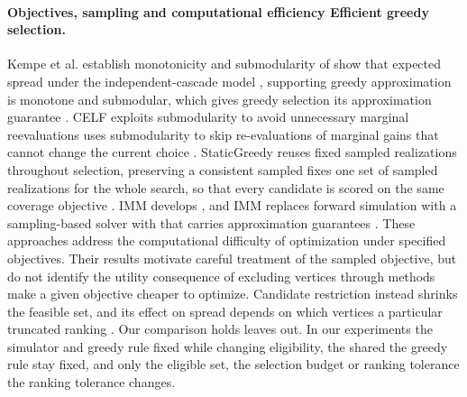 \documentclass[smallextended]{svjour3}
\providecommand{\DIFaddtex}[1]{{\protect\color{blue} \sf #1}} %
\providecommand{\DIFdeltex}[1]{{\protect\color{red} \scriptsize #1}} %
\providecommand{\DIFaddbegin}{} %
\providecommand{\DIFaddend}{} %
\providecommand{\DIFdelbegin}{} %
\providecommand{\DIFdelend}{} %
\providecommand{\DIFadd}[1]{\texorpdfstring{\DIFaddtex{#1}}{#1}} %
\providecommand{\DIFdel}[1]{\texorpdfstring{\DIFdeltex{#1}}{}} %
\providecommand{\DIFscaledelfig}{0.5}
\newlength{\DIFdelgraphicswidth} %
\newlength{\DIFdelgraphicsheight} %
\providecommand{\DIFaddincludegraphics}[2][]{{\color{blue}\fbox{\DIFOincludegraphics[#1]{#2}}}} %
\providecommand{\DIFdelincludegraphics}[2][]{%
\sbox{\DIFdelgraphicsbox}{\DIFOincludegraphics[#1]{#2}}%
\settoboxwidth{\DIFdelgraphicswidth}{\DIFdelgraphicsbox} %
\settoboxtotalheight{\DIFdelgraphicsheight}{\DIFdelgraphicsbox} %
\scalebox{\DIFscaledelfig}{%
\parbox[b]{\DIFdelgraphicswidth}{\usebox{\DIFdelgraphicsbox}\\[-\baselineskip] \rule{\DIFdelgraphicswidth}{0em}}\llap{\resizebox{\DIFdelgraphicswidth}{\DIFdelgraphicsheight}{%
\setlength{\unitlength}{\DIFdelgraphicswidth}%
\begin{picture}(1,1)%
\thicklines\linethickness{2pt} %
{\color[rgb]{1,0,0}\put(0,0){\framebox(1,1){}}}%
{\color[rgb]{1,0,0}\put(0,0){\line( 1,1){1}}}%
{\color[rgb]{1,0,0}\put(0,1){\line(1,-1){1}}}%
\end{picture}%
}\hspace*{3pt}}} %
} %
\DeclareRobustCommand{\DIFaddbegin}{\DIFOaddbegin \let\includegraphics\DIFaddincludegraphics} %
\DeclareRobustCommand{\DIFaddend}{\DIFOaddend \let\includegraphics\DIFOincludegraphics} %
\DeclareRobustCommand{\DIFdelbegin}{\DIFOdelbegin \let\includegraphics\DIFdelincludegraphics} %
\DeclareRobustCommand{\DIFdelend}{\DIFOaddend \let\includegraphics\DIFOincludegraphics} %
\begin{document}
\paragraph{\DIFdelbegin \DIFdel{Objectives, sampling and computational efficiency}\DIFdelend \DIFaddbegin \DIFadd{Efficient greedy selection}\DIFaddend .} Kempe et al. \DIFdelbegin \DIFdel{establish monotonicity and submodularity of }\DIFdelend \DIFaddbegin \DIFadd{show that }\DIFaddend expected spread under the independent-cascade model \DIFdelbegin \DIFdel{, supporting greedy approximation }\DIFdelend \DIFaddbegin \DIFadd{is monotone and submodular, which gives greedy selection its approximation guarantee }\DIFaddend \cite{ref1}. CELF \DIFdelbegin \DIFdel{exploits submodularity to avoid unnecessary marginal reevaluations }\DIFdelend \DIFaddbegin \DIFadd{uses submodularity to skip re-evaluations of marginal gains that cannot change the current choice }\DIFaddend \cite{ref7}. StaticGreedy \DIFdelbegin \DIFdel{reuses fixed sampled realizations throughout selection, preserving a consistent sampled }\DIFdelend \DIFaddbegin \DIFadd{fixes one set of sampled realizations for the whole search, so that every candidate is scored on the same }\DIFaddend coverage objective \cite{ref8}\DIFdelbegin \DIFdel{. IMM develops }\DIFdelend \DIFaddbegin \DIFadd{, and IMM replaces forward simulation with }\DIFaddend a sampling-based solver \DIFdelbegin \DIFdel{with }\DIFdelend \DIFaddbegin \DIFadd{that carries }\DIFaddend approximation guarantees \cite{ref2}. These \DIFdelbegin \DIFdel{approaches address the computational difficulty of optimization under specified objectives. Their results motivate careful treatment of the sampled objective, but do not identify the utility consequence of excluding vertices through }\DIFdelend \DIFaddbegin \DIFadd{methods make a given objective cheaper to optimize. Candidate restriction instead shrinks the feasible set, and its effect on spread depends on which vertices }\DIFaddend a particular truncated ranking \DIFdelbegin \DIFdel{. Our comparison holds }\DIFdelend \DIFaddbegin \DIFadd{leaves out. In our experiments }\DIFaddend the simulator and \DIFdelbegin \DIFdel{greedy rule fixed while changing eligibility, the shared }\DIFdelend \DIFaddbegin \DIFadd{the greedy rule stay fixed, and only the eligible set, the }\DIFaddend selection budget or \DIFdelbegin \DIFdel{ranking tolerance}\DIFdelend \DIFaddbegin \DIFadd{the ranking tolerance changes}\DIFaddend .
\end{document}
